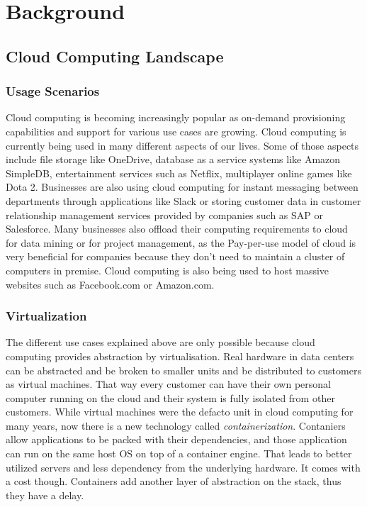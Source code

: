
\chapter{Background}\label{chapter:background} %

\section{Cloud Computing Landscape} %
\subsection{Usage Scenarios}
Cloud computing is becoming increasingly popular as on-demand provisioning capabilities and support for various use cases are growing. Cloud computing is currently being used in many different aspects of our lives. \cite{cloud-use-cases} Some of those aspects include file storage like OneDrive, database as a service systems like Amazon SimpleDB, entertainment services such as Netflix, multiplayer online games like Dota 2. Businesses are also using cloud computing for instant messaging between departments through applications like Slack or storing customer data in customer relationship management services provided by companies such as SAP or Salesforce. Many businesses also offload their computing requirements to cloud for data mining or for project management, as the Pay-per-use model of cloud is very beneficial for companies because they don't need to maintain a cluster of computers in premise. Cloud computing is also being used to host massive websites such as Facebook.com or Amazon.com.
\subsection{Virtualization}
The different use cases explained above are only possible because cloud computing provides abstraction by virtualisation. Real hardware in data centers can be abstracted and be broken to smaller units and be distributed to customers as virtual machines. That way every customer can have their own personal computer running on the cloud and their system is fully isolated from other customers. While virtual machines were the defacto unit in cloud computing for many years, now there is a new technology called \textit{containerization}. Contaniers allow applications to be packed with their dependencies, and those application can run on the same host OS on top of a container engine. That leads to better utilized servers and less dependency from the underlying hardware. It comes with a cost though. Containers add another layer of abstraction on the stack, thus they have a delay. 

